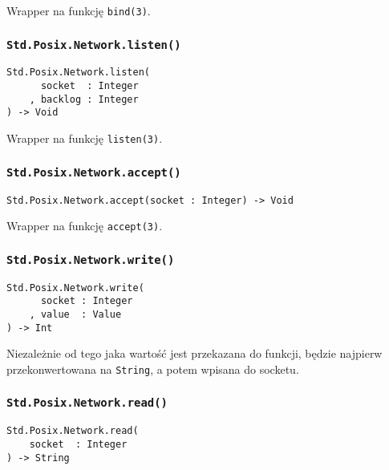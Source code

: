 Wrapper na funkcję \texttt{bind(3)}.

\subsubsection{\texttt{Std.Posix.Network.listen()}}

\begin{small}
\begin{lstlisting}
Std.Posix.Network.listen(
      socket  : Integer
    , backlog : Integer
) -> Void
\end{lstlisting}
\end{small}

Wrapper na funkcję \texttt{listen(3)}.

\subsubsection{\texttt{Std.Posix.Network.accept()}}

\begin{small}
\begin{lstlisting}
Std.Posix.Network.accept(socket : Integer) -> Void
\end{lstlisting}
\end{small}

Wrapper na funkcję \texttt{accept(3)}.

\subsubsection{\texttt{Std.Posix.Network.write()}}

\begin{small}
\begin{lstlisting}
Std.Posix.Network.write(
      socket : Integer
    , value  : Value
) -> Int
\end{lstlisting}
\end{small}

Niezależnie od tego jaka wartość jest przekazana do funkcji, będzie najpierw przekonwertowana na
\texttt{String}, a potem wpisana do socketu.

\subsubsection{\texttt{Std.Posix.Network.read()}}

\begin{small}
\begin{lstlisting}
Std.Posix.Network.read(
    socket  : Integer
) -> String
\end{lstlisting}
\end{small}


